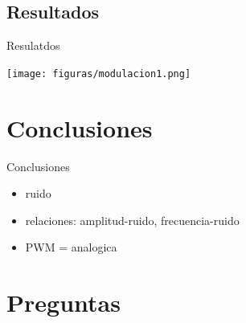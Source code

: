 \documentclass{if-beamer}
\begin{document}
\subsection{Resultados}
\begin{frame}{Resulatdos}
    \begin{center}
    \texttt{[image: figuras/modulacion1.png]}
\end{center}{}
\end{frame}{}

\section{Conclusiones}
\begin{frame}{Conclusiones}
\begin{itemize}
    \item ruido
    \item relaciones: amplitud-ruido, frecuencia-ruido
    \item PWM = analogica 
    
\end{itemize}{}

\end{frame}{}

\section{Preguntas}
\end{document}
